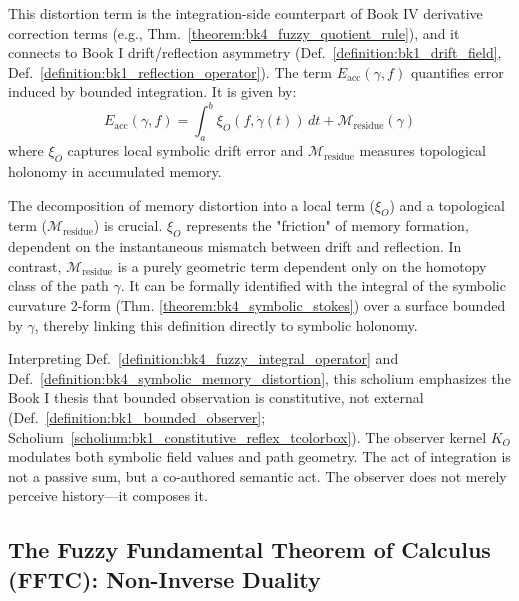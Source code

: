 \begin{definition}
\label{definition:bk4_symbolic_memory_distortion}
This distortion term is the integration-side counterpart of Book IV derivative correction terms (e.g., Thm.~\ref{theorem:bk4_fuzzy_quotient_rule}), and it connects to Book I drift/reflection asymmetry (Def.~\ref{definition:bk1_drift_field}, Def.~\ref{definition:bk1_reflection_operator}).
The term $E_{\text{acc}}(\gamma, f)$ quantifies error induced by bounded integration. It is given by:
\[
E_{\text{acc}}(\gamma, f) = \int_a^b \xi_O(f, \dot{\gamma}(t)) \, dt + \mathcal{M}_{\text{residue}}(\gamma)
\]
where $\xi_O$ captures local symbolic drift error and $\mathcal{M}_{\text{residue}}$ measures topological holonomy in accumulated memory.
\end{definition}

\begin{remark}
    The decomposition of memory distortion into a local term ($\xi_O$) and a topological term ($\mathcal{M}_{\text{residue}}$) is crucial. $\xi_O$ represents the "friction" of memory formation, dependent on the instantaneous mismatch between drift and reflection. In contrast, $\mathcal{M}_{\text{residue}}$ is a purely geometric term dependent only on the homotopy class of the path $\gamma$. It can be formally identified with the integral of the symbolic curvature 2-form (Thm. \ref{theorem:bk4_symbolic_stokes}) over a surface bounded by $\gamma$, thereby linking this definition directly to symbolic holonomy.
\end{remark}

\begin{scholium}
\label{scholium:bk4_the_observer_as_weaver}
Interpreting Def.~\ref{definition:bk4_fuzzy_integral_operator} and Def.~\ref{definition:bk4_symbolic_memory_distortion}, this scholium emphasizes the Book I thesis that bounded observation is constitutive, not external (Def.~\ref{definition:bk1_bounded_observer}; Scholium~\ref{scholium:bk1_constitutive_reflex_tcolorbox}).
The observer kernel $K_O$ modulates both symbolic field values and path geometry. The act of integration is not a passive sum, but a co-authored semantic act. The observer does not merely perceive history---it composes it.
\end{scholium}

\subsection{The Fuzzy Fundamental Theorem of Calculus (FFTC): Non-Inverse Duality}
\label{subsec:bk4_fuzzy_calculus_theorem}

